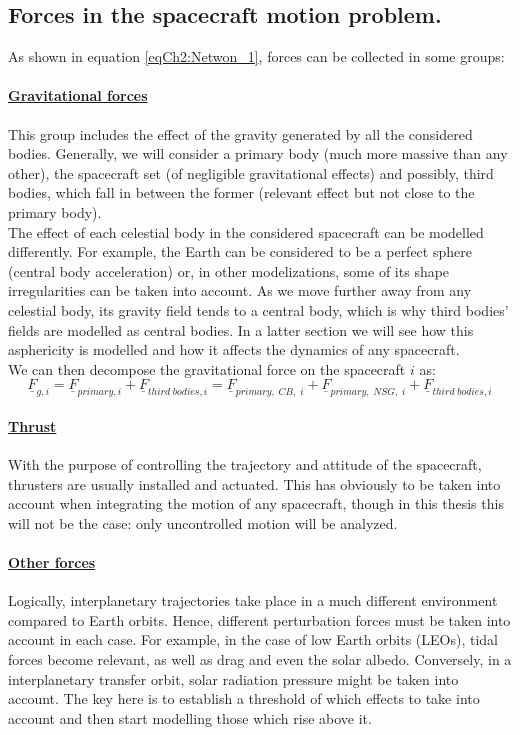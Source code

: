 		\subsection{Forces in the spacecraft motion problem.}
		\indent As shown in equation \eqref{eqCh2:Netwon_1}, forces can be collected in some groups:
			\paragraph{\underline{Gravitational forces}\\} 
			\indent This group includes the effect of the gravity generated by all the considered bodies. Generally, we will consider a primary body (much more massive than any other), the spacecraft set (of negligible gravitational effects) and possibly, third bodies, which fall in between the former (relevant effect but not close to the primary body). \\
			\indent The effect of each celestial body in the considered spacecraft can be modelled differently. For example, the Earth can be considered to be a perfect sphere (central body acceleration) or, in other modelizations, some of its shape irregularities can be taken into account. As we move further away from any celestial body, its gravity field tends to a central body, which is why third bodies' fields are modelled as central bodies. In a latter section we will see how this asphericity is modelled and how it affects the dynamics of any spacecraft. \\
			\indent We can then decompose the gravitational force on the spacecraft $i$ as:
			\[
			\underline{F}_{g, i} = \underline{F}_{primary, i} + \underline{F}_{third\; bodies, i} = \underline{F}_{primary, \;CB, \;i} + \underline{F}_{primary, \; NSG, \;i} + \underline{F}_{third\; bodies, i}
			\]
			\paragraph{\underline{Thrust}\\} 
			\indent With the purpose of controlling the trajectory and attitude of the spacecraft, thrusters are usually installed and actuated. This has obviously to be taken into account when integrating the motion of any spacecraft, though in this thesis this will not be the case: only uncontrolled motion will be analyzed.\\
			\paragraph{\underline{Other forces}\\} 
			\indent Logically, interplanetary trajectories take place in a much different environment compared to Earth orbits. Hence, different perturbation forces must be taken into account in each case. For example, in the case of low Earth orbits (LEOs), tidal forces become relevant, as well as drag and even the solar albedo. Conversely, in a interplanetary transfer orbit, solar radiation pressure might be taken into account. The key here is to establish a threshold of which effects to take into account and then start modelling those which rise above it.\\
